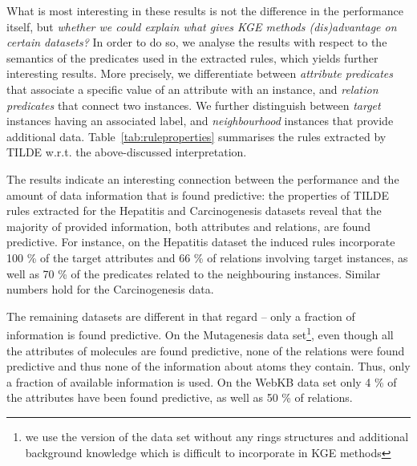 What is most interesting in these results is not the difference in the performance itself, but \textit{whether we could explain what gives KGE methods (dis)advantage on certain datasets?}
In order to do so, we analyse the results with respect to the semantics of the predicates used in the extracted rules, which yields further interesting results.
More precisely, we differentiate between \textit{attribute predicates} that associate a specific value of an attribute with an instance, and \textit{relation predicates} that connect two instances.
We further distinguish between \textit{target} instances having an associated label, and \textit{neighbourhood} instances that provide additional data.
Table~\ref{tab:ruleproperties} summarises the rules extracted by TILDE w.r.t. the above-discussed interpretation.


The results indicate an interesting connection between the performance and the amount of data information that is found predictive: the properties of TILDE rules extracted for the Hepatitis and Carcinogenesis datasets reveal that the majority of provided information, both attributes and relations, are found predictive.
For instance, on the Hepatitis dataset  the induced rules incorporate 100 \% of the target attributes and 66 \% of relations involving target instances, as well as 70 \% of the predicates related to the neighbouring instances.
Similar numbers hold for the Carcinogenesis data.



The remaining datasets are different in that regard -- only a fraction of information is found predictive.
On the Mutagenesis data set\footnote{we use the version of the data set without any rings structures and additional background knowledge which is difficult to incorporate in KGE methods}, even though all the attributes of molecules are found predictive, none of the relations were found predictive and thus none of the information about atoms they contain.
Thus, only a fraction of available information is used.
On the WebKB data set only 4 \% of the attributes have been found predictive, as well as 50 \% of relations.



